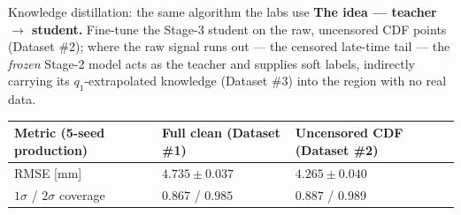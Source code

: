 \documentclass[aspectratio=169,11pt]{beamer}
\newcommand{\good}[1]{\textcolor{goodGreen}{#1}}
\newcommand{\warn}[1]{\textcolor{warnRed}{#1}}
\newcommand{\blue}[1]{\textcolor{aaltoBlue}{#1}}
\begin{document}
\begin{frame}{Knowledge distillation: the same algorithm the labs use}
\small
\textbf{The idea --- teacher $\to$ student.} Fine-tune the Stage-3 student on the raw,
uncensored CDF points (Dataset \#2); where the raw signal runs out --- the \warn{censored
late-time tail} --- the \emph{frozen} Stage-2 model acts as the \blue{teacher} and supplies
\blue{soft labels}, indirectly carrying its $q_1$-extrapolated knowledge (Dataset \#3) into
the region with no real data.

\vspace{0.4em}
\begin{center}
\footnotesize
\renewcommand{\arraystretch}{1.1}
\begin{tabular}{@{}L{4.4cm}R{2.6cm}R{2.6cm}@{}}
\toprule
\textbf{Metric (5-seed production)} & \textbf{Full clean (Dataset \#1)} & \textbf{Uncensored CDF (Dataset \#2)} \\
\midrule
RMSE [mm] & \good{$4.735\pm0.037$} & \good{$4.265\pm0.040$} \\
$1\sigma$ / $2\sigma$ coverage & $0.867$ / $0.985$ & $0.887$ / $0.989$ \\
\bottomrule
\end{tabular}
\end{center}
\end{frame}
\end{document}
